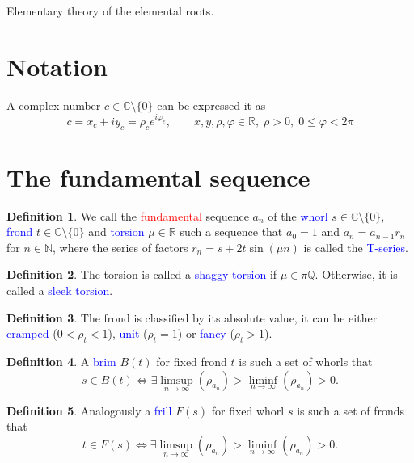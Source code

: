 \documentclass{article}
\def\bc{\begin{center}}
\def\ec{\end{center}}
\newcommand{\red}[1]{\textcolor{red}{#1}}
\newcommand{\blue}[1]{\textcolor{blue}{#1}}
\theoremstyle{plain}
\theoremstyle{definition}
\newtheorem{definition}{Definition}[section]
\newcommand{\cmz}{\mathbb C \setminus \{0\} }
\newcommand{\pir}{\pi \mathbb Q }
\newcommand{\pirr}{\mathbb R \setminus \pi \mathbb Q }
\begin{document}
\bc
\Huge
	Elementary theory of the elemental roots.
\ec


\section{Notation}
    A complex number $c \in \cmz $ can be expressed it as $$
      c = x_c + iy_c = \rho_c e^{i\varphi_c}, \qquad x,y,\rho,\varphi \in \mathbb R, \; \rho > 0, \; 0 \le \varphi < 2\pi
    $$
\section{The fundamental sequence}

    \begin{definition}
        We call the \red{fundamental} sequence  $a_n$ of the \blue{whorl} $s \in \cmz$,  \blue{frond} $t \in \cmz$ and \blue{torsion} $\mu \in \mathbb R$ such a sequence that $a_0=1$ and $a_n = a_{n-1}r_n$ for $n\in \mathbb N$, where the series of factors $r_n = s + 2t \sin (\mu n)$ is called the \blue{T-series}.   
    \end{definition}

    \begin{definition}
        The torsion is called a \blue{shaggy torsion} if $\mu \in \pir$. Otherwise, %
        it is called a \blue{sleek torsion}. 
    \end{definition} 

    \begin{definition}
        The frond is classified by its absolute value, it can be either \blue{cramped} ($0< \rho_t<1$), \blue{unit} ($\rho_t=1$) or \blue{fancy} ($\rho_t>1$).
    \end{definition} 

    \begin{definition}\label{def:brim}
        A \blue{brim} $B(t)$ for fixed frond $t$ is such a set of whorls that $$
            s \in B(t) \Leftrightarrow \exists \limsup_{n \to \infty}(\rho_{a_n})>\liminf_{n \to \infty}(\rho_{a_n})>0
        .$$  
    \end{definition} 
    \begin{definition}\label{def:frill}
        Analogously a \blue{frill} $F(s)$ for fixed whorl $s$ is such a set of fronds that $$
            t \in F(s) \Leftrightarrow \exists \limsup_{n \to \infty}(\rho_{a_n})>\liminf_{n \to \infty}(\rho_{a_n})>0
        .$$  
    \end{definition} 
\end{document}
